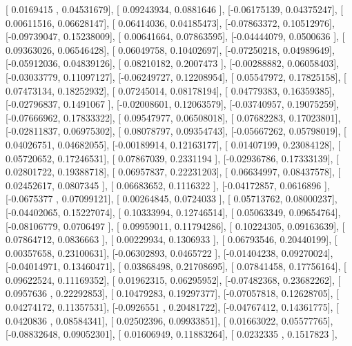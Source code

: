 \documentclass{article}
\begin{document}
       [ 0.0169415 ,  0.04531679],
       [ 0.09243934,  0.0881646 ],
       [-0.06175139,  0.04375247],
       [ 0.00611516,  0.06628147],
       [ 0.06414036,  0.04185473],
       [-0.07863372,  0.10512976],
       [-0.09739047,  0.15238009],
       [ 0.00641664,  0.07863595],
       [-0.04444079,  0.0500636 ],
       [ 0.09363026,  0.06546428],
       [ 0.06049758,  0.10402697],
       [-0.07250218,  0.04989649],
       [-0.05912036,  0.04839126],
       [ 0.08210182,  0.2007473 ],
       [-0.00288882,  0.06058403],
       [-0.03033779,  0.11097127],
       [-0.06249727,  0.12208954],
       [ 0.05547972,  0.17825158],
       [ 0.07473134,  0.18252932],
       [ 0.07245014,  0.08178194],
       [ 0.04779383,  0.16359385],
       [-0.02796837,  0.1491067 ],
       [-0.02008601,  0.12063579],
       [-0.03740957,  0.19075259],
       [-0.07666962,  0.17833322],
       [ 0.09547977,  0.06508018],
       [ 0.07682283,  0.17023801],
       [-0.02811837,  0.06975302],
       [ 0.08078797,  0.09354743],
       [-0.05667262,  0.05798019],
       [ 0.04026751,  0.04682055],
       [-0.00189914,  0.12163177],
       [ 0.01407199,  0.23084128],
       [ 0.05720652,  0.17246531],
       [ 0.07867039,  0.2331194 ],
       [-0.02936786,  0.17333139],
       [ 0.02801722,  0.19388718],
       [ 0.06957837,  0.22231203],
       [ 0.06634997,  0.08437578],
       [ 0.02452617,  0.0807345 ],
       [ 0.06683652,  0.1116322 ],
       [-0.04172857,  0.0616896 ],
       [-0.0675377 ,  0.07099121],
       [ 0.00264845,  0.0724033 ],
       [ 0.05713762,  0.08000237],
       [-0.04402065,  0.15227074],
       [ 0.10333994,  0.12746514],
       [ 0.05063349,  0.09654764],
       [-0.08106779,  0.0706497 ],
       [ 0.09959011,  0.11794286],
       [ 0.10224305,  0.09163639],
       [ 0.07864712,  0.0836663 ],
       [ 0.00229934,  0.1306933 ],
       [ 0.06793546,  0.20440199],
       [ 0.00357658,  0.23100631],
       [-0.06302893,  0.0465722 ],
       [-0.01404238,  0.09270024],
       [-0.04014971,  0.13460471],
       [ 0.03868498,  0.21708695],
       [ 0.07841458,  0.17756164],
       [ 0.09622524,  0.11169352],
       [ 0.01962315,  0.06295952],
       [-0.07482368,  0.23682262],
       [ 0.0957636 ,  0.22292853],
       [ 0.10479283,  0.19297377],
       [-0.07057818,  0.12628705],
       [ 0.04274172,  0.11357531],
       [-0.0926551 ,  0.20481722],
       [-0.04767412,  0.14361775],
       [ 0.0420836 ,  0.08584341],
       [ 0.02502396,  0.09933851],
       [ 0.01663022,  0.05577765],
       [-0.08832648,  0.09052301],
       [ 0.01606949,  0.11883264],
       [ 0.0232335 ,  0.1517823 ],
\end{document}
